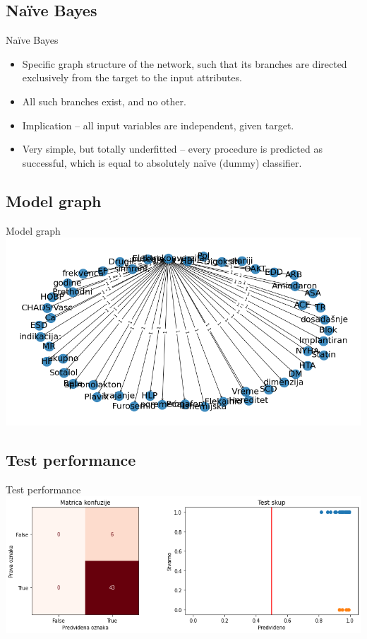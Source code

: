 \documentclass[hyperref={bookmarks=false}]{beamer}
\begin{document}
\subsection{Naïve Bayes}
\begin{frame}{Naïve Bayes}
\begin{itemize}
    \item Specific graph structure of the network, such that its branches are directed exclusively from the target to the input attributes.
    \item All such branches exist, and no other.
    \item Implication -- all input variables are independent, given target.
    \item Very simple, but totally underfitted -- every procedure is predicted as successful, which is equal to absolutely naïve (dummy) classifier.
\end{itemize}
\end{frame}

\subsection{Model graph}
\begin{frame}{Model graph}
\includegraphics[width=\textwidth]{naive1.png}
\end{frame}

\subsection{Test performance}
\begin{frame}{Test performance}
\includegraphics[width=\textwidth]{naive2.png}
\end{frame}
\end{document}
